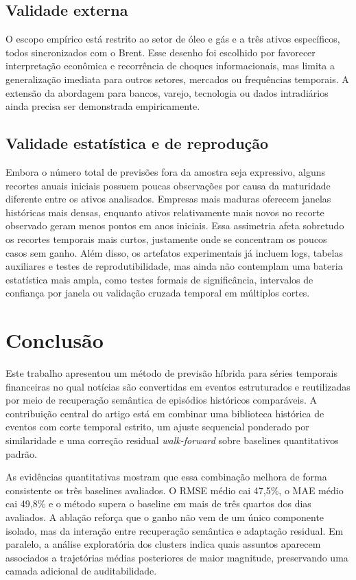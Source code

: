 \documentclass[12pt]{article}
\begin{document}
\subsection{Validade externa}

O escopo empírico está restrito ao setor de óleo e gás e a três ativos específicos, todos sincronizados com o Brent. Esse desenho foi escolhido por favorecer interpretação econômica e recorrência de choques informacionais, mas limita a generalização imediata para outros setores, mercados ou frequências temporais. A extensão da abordagem para bancos, varejo, tecnologia ou dados intradiários ainda precisa ser demonstrada empiricamente.

\subsection{Validade estatística e de reprodução}

Embora o número total de previsões fora da amostra seja expressivo, alguns recortes anuais iniciais possuem poucas observações por causa da maturidade diferente entre os ativos analisados. Empresas mais maduras oferecem janelas históricas mais densas, enquanto ativos relativamente mais novos no recorte observado geram menos pontos em anos iniciais. Essa assimetria afeta sobretudo os recortes temporais mais curtos, justamente onde se concentram os poucos casos sem ganho. Além disso, os artefatos experimentais já incluem logs, tabelas auxiliares e testes de reprodutibilidade, mas ainda não contemplam uma bateria estatística mais ampla, como testes formais de significância, intervalos de confiança por janela ou validação cruzada temporal em múltiplos cortes.

\section{Conclusão}

Este trabalho apresentou um método de previsão híbrida para séries temporais financeiras no qual notícias são convertidas em eventos estruturados e reutilizadas por meio de recuperação semântica de episódios históricos comparáveis. A contribuição central do artigo está em combinar uma biblioteca histórica de eventos com corte temporal estrito, um ajuste sequencial ponderado por similaridade e uma correção residual \textit{walk-forward} sobre baselines quantitativos padrão.

As evidências quantitativas mostram que essa combinação melhora de forma consistente os três baselines avaliados. O RMSE médio cai 47,5\%, o MAE médio cai 49,8\% e o método supera o baseline em mais de três quartos dos dias avaliados. A ablação reforça que o ganho não vem de um único componente isolado, mas da interação entre recuperação semântica e adaptação residual. Em paralelo, a análise exploratória dos clusters indica quais assuntos aparecem associados a trajetórias médias posteriores de maior magnitude, preservando uma camada adicional de auditabilidade.
\end{document}
